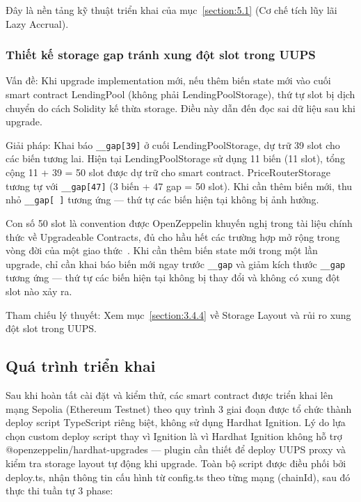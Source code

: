 \documentclass[../DoAn.tex]{subfiles}
\begin{document}
Đây là nền tảng kỹ thuật triển khai của mục~\ref{section:5.1} (Cơ chế tích lũy lãi Lazy Accrual).


\subsubsection{Thiết kế storage gap tránh xung đột slot trong UUPS}
\label{section:6.1.3.b}


Vấn đề: Khi upgrade implementation mới, nếu thêm biến state mới vào cuối smart contract LendingPool (không phải LendingPoolStorage), thứ tự slot bị dịch chuyển do cách Solidity kế thừa storage. Điều này dẫn đến đọc sai dữ liệu sau khi upgrade.

Giải pháp: Khai báo \mbox{\texttt{\_\_gap[39]}} ở cuối LendingPoolStorage, dự trữ 39 slot cho các biến tương lai. Hiện tại LendingPoolStorage sử dụng 11 biến (11 slot), tổng cộng 11 + 39 = 50 slot được dự trữ cho smart contract. PriceRouterStorage tương tự với \mbox{\texttt{\_\_gap[47]}} (3 biến + 47 gap = 50 slot). Khi cần thêm biến mới, thu nhỏ \mbox{\texttt{\_\_gap[ ]}} tương ứng --- thứ tự các biến hiện tại không bị ảnh hưởng.

Con số 50 slot là convention được OpenZeppelin khuyến nghị trong tài liệu chính thức về Upgradeable Contracts, đủ cho hầu hết các trường hợp mở rộng trong vòng đời của một giao thức~\cite{OpenZeppelinDocs}. Khi cần thêm biến state mới trong một lần upgrade, chỉ cần khai báo biến mới ngay trước \mbox{\texttt{\_\_gap}} và giảm kích thước \mbox{\texttt{\_\_gap}} tương ứng --- thứ tự các biến hiện tại không bị thay đổi và không có xung đột slot nào xảy ra.

Tham chiếu lý thuyết: Xem mục~\ref{section:3.4.4} về Storage Layout và rủi ro xung đột slot trong UUPS.


\subsection{Quá trình triển khai}


Sau khi hoàn tất cài đặt và kiểm thử, các smart contract được triển khai lên mạng Sepolia (Ethereum Testnet) theo quy trình 3 giai đoạn được tổ chức thành deploy script TypeScript riêng biệt, không sử dụng Hardhat Ignition. Lý do lựa chọn custom deploy script thay vì Ignition là vì Hardhat Ignition không hỗ trợ @openzeppelin/hardhat-upgrades --- plugin cần thiết để deploy UUPS proxy và kiểm tra storage layout tự động khi upgrade. Toàn bộ script được điều phối bởi deploy.ts, nhận thông tin cấu hình từ config.ts theo từng mạng (chainId), sau đó thực thi tuần tự 3 phase:
\end{document}
